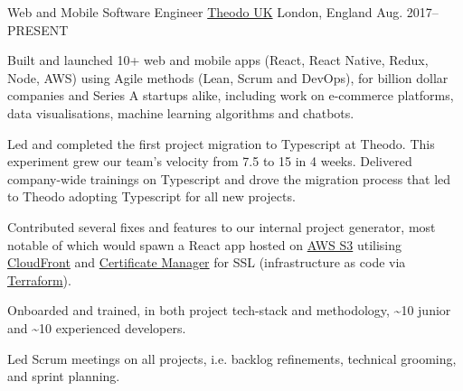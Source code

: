 
\begin{cventries}

  \cventry
    {Web and Mobile Software Engineer}
    {\href{https://www.theodo.co.uk/}{Theodo UK}}
    {London, England}
    {Aug. 2017--\textsc{PRESENT}}
    {
      \begin{cvitems}
        \item Built and launched 10+ web and mobile apps (React, React Native, Redux, Node, AWS) using Agile methods (Lean, Scrum and DevOps), for billion dollar companies and Series A startups alike, including work on e-commerce platforms, data visualisations, machine learning algorithms and chatbots.
        \item Led and completed the first project migration to Typescript at Theodo. This experiment grew our team's velocity from 7.5 to 15 in 4 weeks. Delivered company-wide trainings on Typescript and drove the migration process that led to Theodo adopting Typescript for all new projects.
        \item Contributed several fixes and features to our internal project generator, most notable of which would spawn a React app hosted on \href{https://aws.amazon.com/s3/}{AWS S3} utilising \href{https://aws.amazon.com/cloudfront/}{CloudFront} and \href{https://aws.amazon.com/certificate-manager/}{Certificate Manager} for SSL (infrastructure as code via \href{https://www.terraform.io/}{Terraform}).
        \item Onboarded and trained, in both project tech-stack and methodology, \textasciitilde{}10 junior and \textasciitilde{}10 experienced developers.
        \item Led Scrum meetings on all projects, i.e. backlog refinements, technical grooming, and sprint planning. 
      \end{cvitems}
    }
    {}


\end{cventries}

